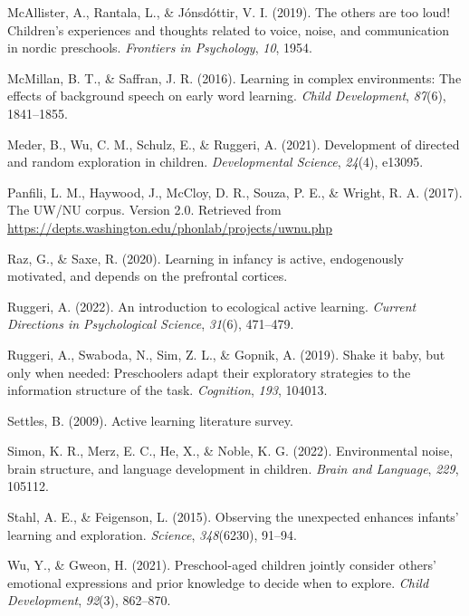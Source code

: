 \documentclass[10pt, letterpaper]{article}
\newenvironment{CSLReferences}%
  {}%
  {\par}
\begin{document}
\begin{CSLReferences}{1}{0}
\leavevmode{}%
McAllister, A., Rantala, L., \& Jónsdóttir, V. I. (2019). The others are
too loud! Children's experiences and thoughts related to voice, noise,
and communication in nordic preschools. \emph{Frontiers in Psychology},
\emph{10}, 1954.

\leavevmode{}%
McMillan, B. T., \& Saffran, J. R. (2016). Learning in complex
environments: The effects of background speech on early word learning.
\emph{Child Development}, \emph{87}(6), 1841--1855.

\leavevmode{}%
Meder, B., Wu, C. M., Schulz, E., \& Ruggeri, A. (2021). Development of
directed and random exploration in children. \emph{Developmental
Science}, \emph{24}(4), e13095.

\leavevmode{}%
Panfili, L. M., Haywood, J., McCloy, D. R., Souza, P. E., \& Wright, R.
A. (2017). The UW/NU corpus. Version 2.0. Retrieved from
\url{https://depts.washington.edu/phonlab/projects/uwnu.php}

\leavevmode{}%
Raz, G., \& Saxe, R. (2020). Learning in infancy is active, endogenously
motivated, and depends on the prefrontal cortices.

\leavevmode{}%
Ruggeri, A. (2022). An introduction to ecological active learning.
\emph{Current Directions in Psychological Science}, \emph{31}(6),
471--479.

\leavevmode{}%
Ruggeri, A., Swaboda, N., Sim, Z. L., \& Gopnik, A. (2019). Shake it
baby, but only when needed: Preschoolers adapt their exploratory
strategies to the information structure of the task. \emph{Cognition},
\emph{193}, 104013.

\leavevmode{}%
Settles, B. (2009). Active learning literature survey.

\leavevmode{}%
Simon, K. R., Merz, E. C., He, X., \& Noble, K. G. (2022). Environmental
noise, brain structure, and language development in children.
\emph{Brain and Language}, \emph{229}, 105112.

\leavevmode{}%
Stahl, A. E., \& Feigenson, L. (2015). Observing the unexpected enhances
infants' learning and exploration. \emph{Science}, \emph{348}(6230),
91--94.

\leavevmode{}%
Wu, Y., \& Gweon, H. (2021). Preschool-aged children jointly consider
others' emotional expressions and prior knowledge to decide when to
explore. \emph{Child Development}, \emph{92}(3), 862--870.

\end{CSLReferences}


\end{document}
